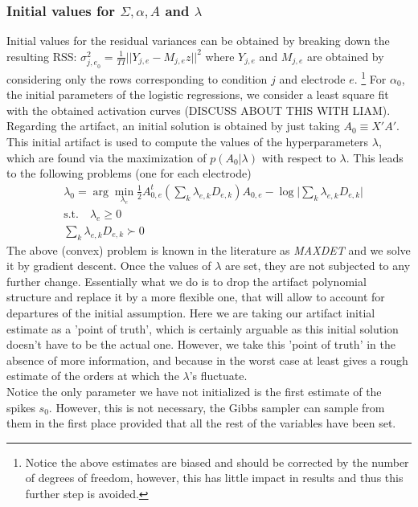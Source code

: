 \documentclass[12pt,letterpaper,fleqn]{article}
\begin{document}
\subsubsection{Initial values for $\Sigma, \alpha,A$ and $\lambda$}
Initial values for the residual variances can be obtained by breaking down the resulting RSS: $\sigma^2_{{j,e}_0}=\frac{1}{TI}||Y_{j,e}-M_{j,e}z||^2$ where $Y_{j,e}$ and $M_{j,e}$ are obtained by considering only the rows corresponding to condition $j$ and electrode $e$. \footnote{Notice the above estimates are biased and should be corrected by the number of degrees of freedom, however, this has little impact in results and thus this further step is avoided.} For $\alpha_0$, the initial parameters of the logistic regressions, we consider a least square fit with the obtained activation curves (DISCUSS ABOUT THIS WITH LIAM). Regarding the artifact, an initial solution is obtained by just taking $A_0\equiv X'A'$. This initial artifact is used to compute the values of the hyperparameters $\lambda$, which are found via the maximization of  $p(A_0|\lambda)$ with respect to $\lambda$. This leads to the following problems (one for each electrode)
\begin{eqnarray}\nonumber & \lambda_0=\arg\min_{\lambda_e} \frac{1}{2}A_{0,e}^t\left(\sum_{k}\lambda_{e,k} D_{e,k} \right)A_{0,e}-\log \bigg|\sum_{k}\lambda_{e,k} D_{e,k}\bigg|\\ \nonumber & \text{s.t.} \quad  \lambda_e\geq 0\\ \nonumber & \sum_{k}\lambda_{e,k} D_{e,k} \succ 0
\end{eqnarray}
The above (convex) problem is known in the literature as \textit{MAXDET} \cite{VandenbergheEtal98} and we solve it by gradient descent. Once the values of $\lambda$ are set, they are not subjected to any further change. Essentially what we do is to drop the artifact polynomial structure and replace it by a more flexible one, that will allow to account for departures of the initial assumption. Here we are taking our artifact initial estimate as a 'point of truth', which is certainly arguable as this initial solution doesn't have to be the actual one. However, we take this 'point of truth'  in the absence of more information, and because in the worst case at least gives a rough estimate of the orders at which the  $\lambda$'s fluctuate.\\

Notice the only parameter we have not initialized is the first estimate of the spikes $s_0$. However, this is not necessary, the Gibbs sampler can sample from them in the first place provided that all the rest of the variables have been set.  
\end{document}
